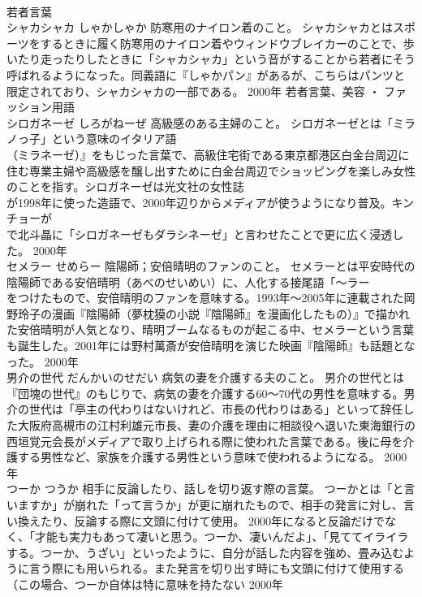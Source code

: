 \documentclass[8pt]{extreport}
\begin{document}
\begin{CJK}{UTF8}{min}
\\	若者言葉	
\\	シャカシャカ	しゃかしゃか	防寒用のナイロン着のこと。	シャカシャカとはスポーツをするときに履く防寒用のナイロン着やウィンドウブレイカーのことで、歩いたり走ったりしたときに「シャカシャカ」という音がすることから若者にそう呼ばれるようになった。同義語に『しゃかパン』があるが、こちらはパンツと限定されており、シャカシャカの一部である。	2000年	若者言葉、美容 ・ ファッション用語	
\\	シロガネーゼ	しろがねーぜ	高級感のある主婦のこと。	シロガネーゼとは「ミラノっ子」という意味のイタリア語
\\	（ミラネーゼ）』をもじった言葉で、高級住宅街である東京都港区白金台周辺に住む専業主婦や高級感を醸し出すために白金台周辺でショッピングを楽しみ女性のことを指す。シロガネーゼは光文社の女性誌
\\	が1998年に使った造語で、2000年辺りからメディアが使うようになり普及。キンチョーが
\\	で北斗晶に「シロガネーゼもダラシネーゼ」と言わせたことで更に広く浸透した。	2000年	
\\	セメラー	せめらー	陰陽師；安倍晴明のファンのこと。	セメラーとは平安時代の陰陽師である安倍晴明（あべのせいめい）に、人化する接尾語「～ラー
\\	をつけたもので、安倍晴明のファンを意味する。1993年～2005年に連載された岡野玲子の漫画『陰陽師（夢枕獏の小説『陰陽師』を漫画化したもの）』で描かれた安倍晴明が人気となり、晴明ブームなるものが起こる中、セメラーという言葉も誕生した。2001年には野村萬斎が安倍晴明を演じた映画『陰陽師』も話題となった。	2000年	
\\	男介の世代	だんかいのせだい	病気の妻を介護する夫のこと。	男介の世代とは『団塊の世代』のもじりで、病気の妻を介護する60～70代の男性を意味する。男介の世代は「亭主の代わりはないけれど、市長の代わりはある」といって辞任した大阪府高槻市の江村利雄元市長、妻の介護を理由に相談役へ退いた東海銀行の西垣覚元会長がメディアで取り上げられる際に使われた言葉である。後に母を介護する男性など、家族を介護する男性という意味で使われるようになる。	2000年	
\\	つーか	つうか	相手に反論したり、話しを切り返す際の言葉。	つーかとは「と言いますか」が崩れた「って言うか」が更に崩れたもので、相手の発言に対し、言い換えたり、反論する際に文頭に付けて使用。 2000年になると反論だけでなく、「才能も実力もあって凄いと思う。つーか、凄いんだよ」、「見ててイライラする。つーか、うざい」といったように、自分が話した内容を強め、畳み込むように言う際にも用いられる。また発言を切り出す時にも文頭に付けて使用する（この場合、つーか自体は特に意味を持たない	2000年	

\end{CJK}
\end{document}
